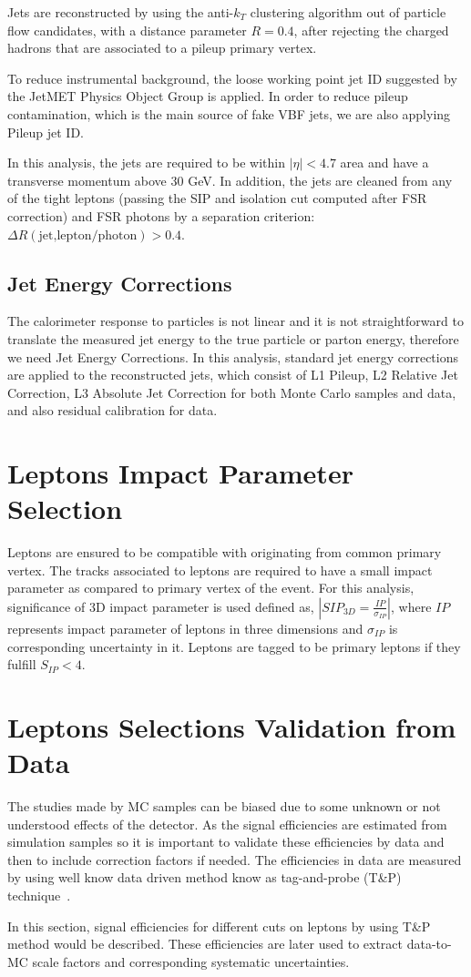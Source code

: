 Jets are reconstructed by using the anti-$k_T$ clustering algorithm out of particle flow candidates, with a distance parameter $R = 0.4$, after rejecting
the charged hadrons that are associated to a pileup primary vertex.

To reduce instrumental background, the loose working point jet ID suggested by the JetMET Physics Object Group is applied. In order to reduce pileup 
contamination, which is the main source of fake VBF jets, we are also applying Pileup jet ID.

In this analysis, the jets are required to be within $|\eta| < 4.7$ area and have a transverse momentum above 30 GeV. In addition, the jets are cleaned 
from any of the tight leptons (passing the SIP and isolation cut computed after FSR correction) and FSR photons by a separation 
criterion: $\Delta R(\text{jet,lepton/photon}) > 0.4$.


\subsection{Jet Energy Corrections}

The calorimeter response to particles is not linear
and it is not straightforward to translate the measured jet energy
to the true particle or parton energy, therefore we need Jet Energy Corrections.
In this analysis, standard jet energy corrections are applied to the reconstructed jets,
which consist of L1 Pileup, L2 Relative Jet Correction,
L3 Absolute Jet Correction for both Monte Carlo samples and data,
and also residual calibration for data.

\section{Leptons Impact Parameter Selection}
Leptons are ensured to be compatible with originating from common primary vertex. The tracks associated to leptons are required to have a small 
impact parameter as compared to primary vertex of the event. For this analysis, significance of 3D impact parameter is used defined as, 
$|SIP_{3D} = \frac{IP}{\sigma_{IP}}|$, where $IP$ represents impact parameter of leptons in three dimensions and $\sigma_{IP}$ is corresponding uncertainty
in it. Leptons are tagged to be primary leptons if they fulfill $S_{IP} < 4$. 

\section{Leptons Selections Validation from Data}
The studies made by MC samples can be biased due to some unknown or not understood effects of the detector. As the signal efficiencies are estimated 
from simulation samples so it is important to validate these efficiencies by data and then to include correction factors if needed. The efficiencies in data
are measured by using well know data driven method know as tag-and-probe (T\&P) technique~\cite{cms:38a, cms:38c}. 
\par In this section, signal efficiencies for different cuts on leptons by using T\&P method would be described.  These efficiencies are later used to extract
data-to-MC scale factors and corresponding systematic uncertainties. 
